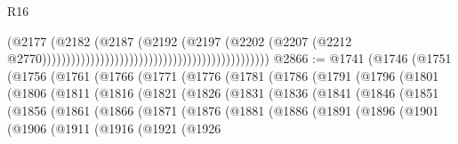 \begin{lexlean}{R16}
\begin{coremodule}
                                                                                  (@2177
                                                                                    (@2182
                                                                                      (@2187
                                                                                        (@2192
                                                                                          (@2197
                                                                                            (@2202
                                                                                              (@2207
                                                                                                (@2212
                                                                                                  @2770)))))))))))))))))))))))))))))))))))))))))))))))
@2866 := @1741
    (@1746
      (@1751
        (@1756
          (@1761
            (@1766
              (@1771
                (@1776
                  (@1781
                    (@1786
                      (@1791
                        (@1796
                          (@1801
                            (@1806
                              (@1811
                                (@1816
                                  (@1821
                                    (@1826
                                      (@1831
                                        (@1836
                                          (@1841
                                            (@1846
                                              (@1851
                                                (@1856
                                                  (@1861
                                                    (@1866
                                                      (@1871
                                                        (@1876
                                                          (@1881
                                                            (@1886
                                                              (@1891
                                                                (@1896
                                                                  (@1901
                                                                    (@1906
                                                                      (@1911
                                                                        (@1916
                                                                          (@1921
                                                                            (@1926

\end{coremodule}
\end{lexlean}
